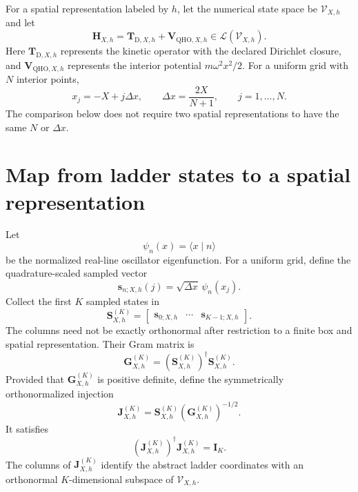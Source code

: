 For a spatial representation labeled by $h$, let the numerical state space be
$\mathcal V_{X,h}$ and let
\begin{equation}
    \mathbf H_{X,h}
    =
    \mathbf T_{\mathrm D,X,h}
    +
    \mathbf V_{\mathrm{QHO},X,h}
    \in
    \mathcal L(\mathcal V_{X,h}).
\end{equation}
Here $\mathbf T_{\mathrm D,X,h}$ represents the kinetic operator with the
declared Dirichlet closure, and $\mathbf V_{\mathrm{QHO},X,h}$ represents the
interior potential $m\omega^2x^2/2$. For a uniform grid with $N$ interior
points,
\begin{equation}
    x_j=-X+j\Delta x,
    \qquad
    \Delta x=\frac{2X}{N+1},
    \qquad
    j=1,\ldots,N.
\end{equation}
The comparison below does not require two spatial representations to have the
same $N$ or $\Delta x$.

\section*{Map from ladder states to a spatial representation}

Let
\begin{equation}
    \psi_n(x)=\langle x\mid n\rangle
\end{equation}
be the normalized real-line oscillator eigenfunction. For a uniform grid,
define the quadrature-scaled sampled vector
\begin{equation}
    \mathbf s_{n;X,h}(j)
    =
    \sqrt{\Delta x}\,\psi_n(x_j).
\end{equation}
Collect the first $K$ sampled states in
\begin{equation}
    \mathbf S_{X,h}^{(K)}
    =
    \begin{bmatrix}
        \mathbf s_{0;X,h}
        & \cdots &
        \mathbf s_{K-1;X,h}
    \end{bmatrix}.
\end{equation}
The columns need not be exactly orthonormal after restriction to a finite box
and spatial representation. Their Gram matrix is
\begin{equation}
    \mathbf G_{X,h}^{(K)}
    =
    \left(\mathbf S_{X,h}^{(K)}\right)^\dagger
    \mathbf S_{X,h}^{(K)}.
\end{equation}
Provided that $\mathbf G_{X,h}^{(K)}$ is positive definite, define the
symmetrically orthonormalized injection
\begin{equation}
    \mathbf J_{X,h}^{(K)}
    =
    \mathbf S_{X,h}^{(K)}
    \left(\mathbf G_{X,h}^{(K)}\right)^{-1/2}.
\end{equation}
It satisfies
\begin{equation}
    \left(\mathbf J_{X,h}^{(K)}\right)^\dagger
    \mathbf J_{X,h}^{(K)}
    =
    \mathbf I_K.
\end{equation}
The columns of $\mathbf J_{X,h}^{(K)}$ identify the abstract ladder coordinates
with an orthonormal $K$-dimensional subspace of $\mathcal V_{X,h}$.

